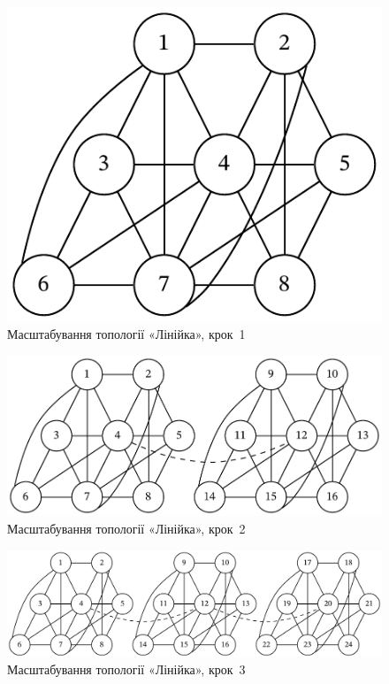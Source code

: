 \documentclass[
	a4paper,
	oneside,
	BCOR = 10mm,
	DIV = 12,
	12pt,
	headings = normal,
]{scrartcl}
\begin{document}
				\begin{figure}[!htbp]
					\centering
					\includegraphics[height=7\baselineskip]{./assets/cluster-08-01-named.pdf}
					\caption{Масштабування топології «Лінійка», крок~1}
					\label{fig:cluster-08-02-line-s01}
				\end{figure}

				\begin{figure}[!htbp]
					\centering
					\includegraphics[height=7\baselineskip]{./assets/cluster-08-02-line-s02.pdf}
					\caption{Масштабування топології «Лінійка», крок~2}
					\label{fig:cluster-08-02-line-s02}
				\end{figure}

				\begin{figure}[!htbp]
					\centering
					\includegraphics[height=7\baselineskip]{./assets/cluster-08-02-line-s03.pdf}
					\caption{Масштабування топології «Лінійка», крок~3}
					\label{fig:cluster-08-02-line-s03}
				\end{figure}
\end{document}

